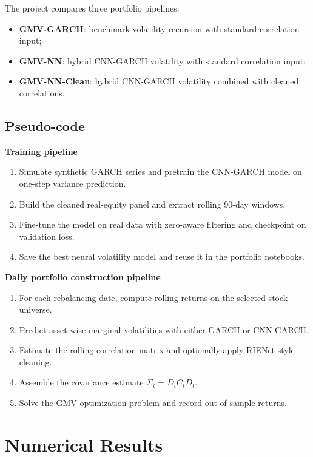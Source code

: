 \documentclass[11pt,a4paper]{article}
\begin{document}
The project compares three portfolio pipelines:
\begin{itemize}[leftmargin=1.5em]
\item \textbf{GMV-GARCH}: benchmark volatility recursion with standard correlation input;
\item \textbf{GMV-NN}: hybrid CNN-GARCH volatility with standard correlation input;
\item \textbf{GMV-NN-Clean}: hybrid CNN-GARCH volatility combined with cleaned correlations.
\end{itemize}

\subsection{Pseudo-code}

\textbf{Training pipeline}
\begin{enumerate}[leftmargin=1.5em]
\item Simulate synthetic GARCH series and pretrain the CNN-GARCH model on one-step variance prediction.
\item Build the cleaned real-equity panel and extract rolling 90-day windows.
\item Fine-tune the model on real data with zero-aware filtering and checkpoint on validation loss.
\item Save the best neural volatility model and reuse it in the portfolio notebooks.
\end{enumerate}

\textbf{Daily portfolio construction pipeline}
\begin{enumerate}[leftmargin=1.5em]
\item For each rebalancing date, compute rolling returns on the selected stock universe.
\item Predict asset-wise marginal volatilities with either GARCH or CNN-GARCH.
\item Estimate the rolling correlation matrix and optionally apply RIENet-style cleaning.
\item Assemble the covariance estimate $\Sigma_t = D_t C_t D_t$.
\item Solve the GMV optimization problem and record out-of-sample returns.
\end{enumerate}

\section{Numerical Results}
\end{document}

